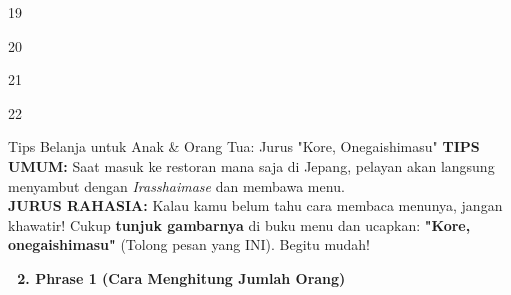 \begin{convobox}{19}
    \noindent

    \vspace{1.5em}
\end{convobox}

\begin{convobox}{20}
    \noindent

    \vspace{1.5em}
\end{convobox}

\begin{convobox}{21}
    \noindent

    \vspace{1.5em}
\end{convobox}

\begin{convobox}{22}
    \noindent
      
     

    \vspace{1.5em}
\end{convobox}

\begin{lessonbox}{Tips Belanja untuk Anak \& Orang Tua: Jurus "Kore, Onegaishimasu"}
    \textbf{TIPS UMUM:} Saat masuk ke restoran mana saja di Jepang, pelayan akan langsung menyambut dengan \textit{Irasshaimase} dan membawa menu. 
    \\
    \textbf{JURUS RAHASIA:} Kalau kamu belum tahu cara membaca menunya, jangan khawatir! Cukup \textbf{tunjuk gambarnya} di buku menu dan ucapkan: \textbf{"Kore, onegaishimasu"} (Tolong pesan yang INI). Begitu mudah!
\end{lessonbox}

\vspace{2em}
\begin{tcolorbox}[colback=boxframe, colframe=boxframe, rounded corners, boxrule=0pt, arc=3mm, left=2mm, top=2mm, bottom=2mm]
    \Large \bfseries \color{white} 👥 2. Phrase 1 (Cara Menghitung Jumlah Orang)
\end{tcolorbox}
\vspace{1em}

